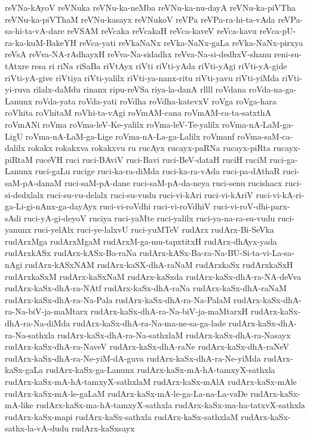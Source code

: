 {reVNa-kAyoV
reVNuka
reVNu-ka-neMba
reVNu-ka-nu-dayA
reVNu-ka-piVTha
reVNu-ka-piVThaM
reVNu-kasayx
reVNukoV
reVPa
reVPa-ra-hi-ta-vAda
reVPa-sa-hi-ta-vA-dare
reVSAM
reVcaka
reVcakaH
reVca-kaveV
reVca-kavu
reVca-pU-ra-ka-kuM-BakeYH
reVca-yati
reVkaNaNx
reVka-NaNx-gaLa
reVka-NaNx-pirxya
reVsA
reVva-NA-rAdhayxH
reVva-Na-sidadhx
reVva-Na-si-dedhxV-shanu
reni-su-tAtxre
resa
ri
riNa
riSaBa
riVtAyx
riVti
riVti-yAda
riVti-yAgi
riVti-yA-gide
riVti-yA-give
riVtiya
riVti-yalilx
riVti-ya-nanx-ritu
riVti-yavu
riVti-yiMda
riVti-yi-ruva
rilalx-daMdu
rinanx
ripu-reVSa
riya-la-danA
rllll
roVdana
roVda-na-ga-Lanunx
roVda-yata
roVda-yati
roVdha
roVdha-katevxV
roVga
roVga-hara
roVhita
roVhitaM
roVhi-ta-vAgi
roVmAM-cana
roVmAM-ca-ta-satxthA
roVmANi
roVma
roVma-leV-Ke-yalilx
roVma-leV-Te-yalilx
roVma-nA-LaM-ga-LigU
roVma-nA-LaM-ga-Lige
roVma-nA-La-ga-Lalilx
roVmanf
roVma-saM-ca-dalilx
rokakx
rokakxva
rokakxvu
ru
rucAyx
rucayx-paRNa
rucayx-piRta
rucayx-piRtaM
ruceVH
ruci
ruci-BAviV
ruci-Bavi
ruci-BeV-dataH
ruciH
ruciM
ruci-ga-Lanunx
ruci-gaLu
rucige
ruci-ka-ra-diMda
ruci-ka-ra-vAda
ruci-pa-dAthaR
ruci-saM-pA-danaM
ruci-saM-pA-dane
ruci-saM-pA-da-neya
ruci-senu
rucishacx
ruci-si-dedxlalx
ruci-su-vu-delalx
ruci-su-vudu
ruci-vi-kAri
ruci-vi-kAriV
ruci-vi-kA-ri-ga-Li-gi-nAnx-ga-dayAyx
ruci-vi-roVdhi
ruci-vi-roVdhiV
ruci-vi-roV-dhi-parx-sAdi
ruci-yA-gi-deyoV
ruciya
ruci-yaMte
ruci-yalilx
ruci-ya-na-ra-su-vudu
ruci-yanunx
ruci-yelAlx
ruci-ye-lalxvU
ruci-yuMTeV
rudArx
rudArx-Bi-SeVka
rudArxMga
rudArxMgaM
rudArxM-ga-mu-tapxtitxH
rudArx-dhAyx-yada
rudArxkASx
rudArx-kASx-Ba-raNa
rudArx-kASx-Ba-ra-Na-BU-Si-ta-vi-La-sa-nAgi
rudArx-kASxNAM
rudArx-kaSX-dhA-raNaM
rudArxkaSx
rudArxkaSxH
rudArxkaSxM
rudArx-kaSxNaM
rudArx-kaSxda
rudArx-kaSx-dhA-ra-NA-deVva
rudArx-kaSx-dhA-ra-NAtf
rudArx-kaSx-dhA-raNa
rudArx-kaSx-dhA-raNaM
rudArx-kaSx-dhA-ra-Na-Pala
rudArx-kaSx-dhA-ra-Na-PalaM
rudArx-kaSx-dhA-ra-Na-biV-ja-maMtarx
rudArx-kaSx-dhA-ra-Na-biV-ja-maMtarxH
rudArx-kaSx-dhA-ra-Na-diMda
rudArx-kaSx-dhA-ra-Na-ma-ne-sa-ga-lade
rudArx-kaSx-dhA-ra-Na-sathxla
rudArx-kaSx-dhA-ra-Na-sathxlaM
rudArx-kaSx-dhA-ra-Nasayx
rudArx-kaSx-dhA-ra-NaveV
rudArx-kaSx-dhA-raNe
rudArx-kaSx-dhA-raNeV
rudArx-kaSx-dhA-ra-Ne-yiM-dA-guva
rudArx-kaSx-dhA-ra-Ne-yiMda
rudArx-kaSx-gaLa
rudArx-kaSx-ga-Lanunx
rudArx-kaSx-mA-hA-tamxyX-sathxla
rudArx-kaSx-mA-hA-tamxyX-sathxlaM
rudArx-kaSx-mAlA
rudArx-kaSx-mAle
rudArx-kaSx-mA-le-gaLaM
rudArx-kaSx-mA-le-ga-La-na-La-vaDe
rudArx-kaSx-mA-like
rudArx-kaSx-ma-hA-tamxyX-sathxla
rudArx-kaSx-ma-ha-tatxvX-sathxla
rudArx-kaSx-mapi
rudArx-kaSx-sathxla
rudArx-kaSx-sathxlaM
rudArx-kaSx-sathx-la-vA-dudu
rudArx-kaSxsayx
}

